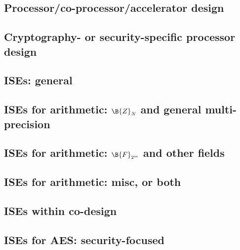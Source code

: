 
\subsection*{Processor/co-processor/accelerator design}
\cite{SCARV:Gutmann:00}
\cite{SCARV:WuWeaAus:01}
\cite{SCARV:TheSisPne:09}
\cite{SCARV:MTRGS:99}
\cite{SCARV:GGHJPTW:11}

\subsection*{Cryptography- or security-specific processor design}
\cite{SCARV:FouMoo:05,SCARV:Fournier:07,SCARV:KocSavGro:08,SCARV:TilKirSze:10,SCARV:NREAMM:12,SCARV:YumSav:15,SCARV:RagAmbPar:15,SCARV:AweAus:17,SCARV:YHEF:18}

\subsection*{ISEs: general}
\cite{SCARV:BarGioMar:09}
\cite{SCARV:RegIen:16}
\cite{SCARV:FazLopOli:18}

\subsection*{ISEs for arithmetic: $\B{Z}_{N}$ and general multi-precision}
\cite{SCARV:Gro:02,SCARV:GroKam:03:a,SCARV:GAST:05,SCARV:GroTilSze:07}
\subsection*{ISEs for arithmetic: $\B{F}_{2^m}$ and other fields}
\cite{SCARV:GroKam:03:b,SCARV:FisLee:04,SCARV:GKP:04}
\subsection*{ISEs for arithmetic: misc, or both}
\cite{SCARV:GroKam:03,SCARV:GroSav:04}

\subsection*{ISEs within co-design}
\cite{SCARV:KLWGSTW:06,SCARV:GIPTV:06}

\subsection*{ISEs for AES: security-focused}
\cite{SCARV:TilGro:07:a}
